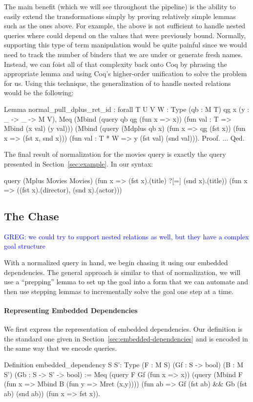 \documentclass[preprint]{sigplanconf}
\newcommand{\greg}[1]{\textcolor{blue}{GREG: #1}}
\begin{document}
The main benefit (which we will see throughout the pipeline) is the ability to easily extend the transformations simply by proving relatively simple lemmas such as the ones above.
For example, the above  is not sufficient to handle nested queries where  could depend on the values that were previously bound.
Normally, supporting this type of term manipulation would be quite painful since we would need to track the number of binders that we are under or generate fresh names.
Instead, we can foist all of that complexity back onto Coq by phrasing the appropriate lemma and using Coq's higher-order unification to solve the problem for us.
Using this technique, the generalization of  to handle nested relations would be the following:
\begin{coq}
Lemma normal_pull_dplus_ret_id
: forall {T U V W : Type} (qb : M T) qg x (y : _ -> _ -> M V),
  Meq (Mbind (query qb qg (fun x => x))
             (fun val : T => Mbind (x val) (y val)))
      (Mbind (query (Mdplus qb x) (fun x => qg (fst x)) (fun x => (fst x, snd x)))
             (fun val : T * W => y (fst val) (snd val))).
Proof. ... Qed.
\end{coq}

The final result of normalization for the movies query is exactly the query presented in Section~\ref{sec:example}.
In our syntax:
\begin{coq}
query (Mplus Movies Movies)
      (fun x => (fst x).(title) ?[=] (snd x).(title))
      (fun x => ((fst x).(director), (snd x).(actor)))
\end{coq}

\subsection{The Chase}
\greg{we could try to support nested relations as well, but they have a complex goal structure}

With a normalized query in hand, we begin chasing it using our embedded dependencies.
The general approach is similar to that of normalization, we will use a ``prepping'' lemma to set up the goal into a form that we can automate and then use stepping lemmas to incrementally solve the goal one step at a time.

\paragraph{Representing Embedded Dependencies}
We first express the representation of embedded dependencies.
Our definition is the standard one given in Section~\ref{sec:embedded-dependencies} and is encoded in the same way that we encode queries.
\begin{coq}
Definition embedded_dependency {S S': Type}
  (F : M S) (Gf : S -> bool) (B : M S') (Gb : S -> S' -> bool) :=
  Meq (query F Gf (fun x => x))
      (query (Mbind F (fun x => Mbind B (fun y => Mret (x,y))))
             (fun ab => Gf (fst ab) && Gb (fst ab) (snd ab))
             (fun x => fst x)).
\end{coq}
\end{document}
